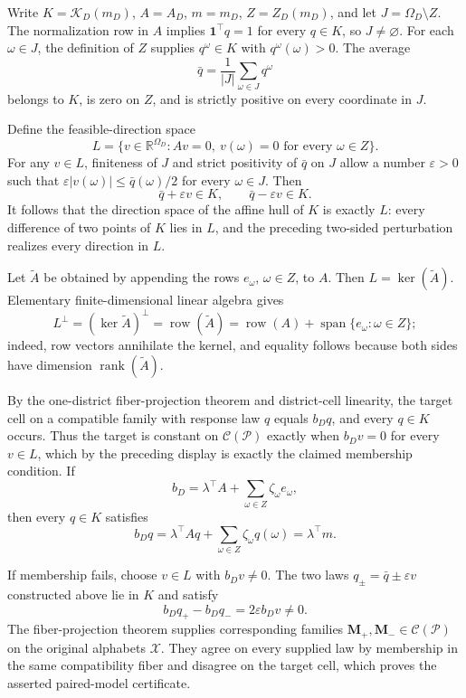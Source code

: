 Write \(K=\mathcal K_D(m_D)\), \(A=A_D\), \(m=m_D\), \(Z=Z_D(m_D)\), and let \(J=\Omega_D\setminus Z\).  The normalization row in \(A\) implies \(\mathbf 1^\top q=1\) for every \(q\in K\), so \(J\neq\varnothing\).  For each \(\omega\in J\), the definition of \(Z\) supplies \(q^{\omega}\in K\) with \(q^{\omega}(\omega)>0\).  The average
\[
 \bar q=\frac1{|J|}\sum_{\omega\in J}q^{\omega}
\]
belongs to \(K\), is zero on \(Z\), and is strictly positive on every coordinate in \(J\).

Define the feasible-direction space
\[
 L=\{v\in\mathbb R^{\Omega_D}:Av=0,\ v(\omega)=0\text{ for every }\omega\in Z\}.
\]
For any \(v\in L\), finiteness of \(J\) and strict positivity of \(\bar q\) on \(J\) allow a number \(\varepsilon>0\) such that
\(
 \varepsilon |v(\omega)|\leq \bar q(\omega)/2
\)
for every \(\omega\in J\).  Then
\[
 \bar q+\varepsilon v\in K,
 \qquad \bar q-\varepsilon v\in K.
\]
It follows that the direction space of the affine hull of \(K\) is exactly \(L\): every difference of two points of \(K\) lies in \(L\), and the preceding two-sided perturbation realizes every direction in \(L\).

Let \(\widetilde A\) be obtained by appending the rows \(e_\omega\), \(\omega\in Z\), to \(A\).  Then \(L=\ker(\widetilde A)\).  Elementary finite-dimensional linear algebra gives
\[
 L^\perp=(\ker\widetilde A)^\perp
 =\operatorname{row}(\widetilde A)
 =\operatorname{row}(A)+\operatorname{span}\{e_\omega:\omega\in Z\};
\]
indeed, row vectors annihilate the kernel, and equality follows because both sides have dimension \(\operatorname{rank}(\widetilde A)\).

By the one-district fiber-projection theorem and district-cell linearity, the target cell on a compatible family with response law \(q\) equals \(b_Dq\), and every \(q\in K\) occurs.  Thus the target is constant on \(\mathcal C(\mathcal P)\) exactly when \(b_Dv=0\) for every \(v\in L\), which by the preceding display is exactly the claimed membership condition.  If
\[
 b_D=\lambda^\top A+\sum_{\omega\in Z}\zeta_\omega e_\omega,
\]
then every \(q\in K\) satisfies
\[
 b_Dq=\lambda^\top Aq+\sum_{\omega\in Z}\zeta_\omega q(\omega)
 =\lambda^\top m.
\]

If membership fails, choose \(v\in L\) with \(b_Dv\neq0\).  The two laws \(q_\pm=\bar q\pm\varepsilon v\) constructed above lie in \(K\) and satisfy
\[
 b_Dq_+-b_Dq_-=2\varepsilon b_Dv\neq0.
\]
The fiber-projection theorem supplies corresponding families \(\mathbf M_+,\mathbf M_-\in\mathcal C(\mathcal P)\) on the original alphabets \(\mathcal X\).  They agree on every supplied law by membership in the same compatibility fiber and disagree on the target cell, which proves the asserted paired-model certificate.